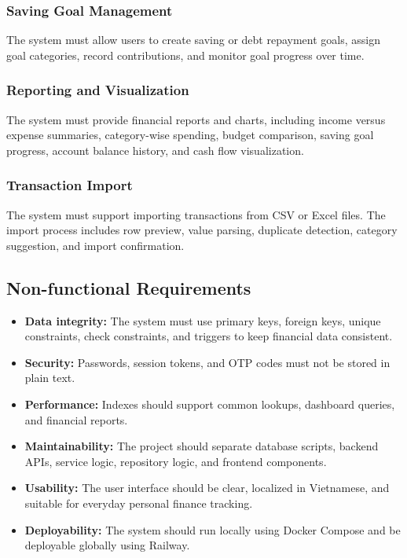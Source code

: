 \documentclass{article}
\begin{document}
\subsubsection{Saving Goal Management}
The system must allow users to create saving or debt repayment goals, assign goal categories, record contributions, and monitor goal progress over time.

\subsubsection{Reporting and Visualization}
The system must provide financial reports and charts, including income versus expense summaries, category-wise spending, budget comparison, saving goal progress, account balance history, and cash flow visualization.

\subsubsection{Transaction Import}
The system must support importing transactions from CSV or Excel files. The import process includes row preview, value parsing, duplicate detection, category suggestion, and import confirmation.

\subsection{Non-functional Requirements}

\begin{itemize}
    \item \textbf{Data integrity:} The system must use primary keys, foreign keys, unique constraints, check constraints, and triggers to keep financial data consistent.
    \item \textbf{Security:} Passwords, session tokens, and OTP codes must not be stored in plain text.
    \item \textbf{Performance:} Indexes should support common lookups, dashboard queries, and financial reports.
    \item \textbf{Maintainability:} The project should separate database scripts, backend APIs, service logic, repository logic, and frontend components.
    \item \textbf{Usability:} The user interface should be clear, localized in Vietnamese, and suitable for everyday personal finance tracking.
    \item \textbf{Deployability:} The system should run locally using Docker Compose and be deployable globally using Railway.
\end{itemize}
\end{document}
